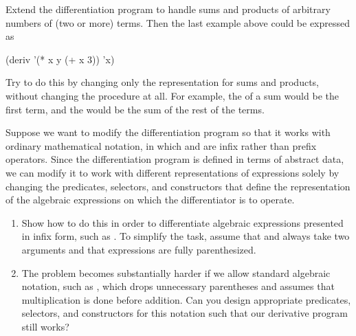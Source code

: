 \begin{exercise}
	\label{Exercise 2.57}
	Extend the differentiation program to handle sums and products of arbitrary numbers of (two or more) terms.
	Then the last example above could be expressed as
	\begin{scheme}
	  (deriv '(* x y (+ x 3)) 'x)
	\end{scheme}
	Try to do this by changing only the representation for sums and products, without changing the  procedure at all.
	For example, the  of a sum would be the first term, and the  would be the sum of the rest of the terms.
\end{exercise}



\begin{exercise}
	\label{Exercise 2.58}
	Suppose we want to modify the differentiation program so that it works with ordinary mathematical notation, in which \code{+} and \code{*} are infix rather than prefix operators.
	Since the differentiation program is defined in terms of abstract data, we can modify it to work with different representations of expressions solely by changing the predicates, selectors, and constructors that define the representation of the algebraic expressions on which the differentiator is to operate.
	\begin{enumerate}[label = \alph*., leftmargin = *]

		\item
			Show how to do this in order to differentiate algebraic expressions presented  in infix form, such as .
			To simplify the task, assume that \code{+} and \code{*} always take two arguments and that expressions are fully parenthesized.

		\item
			The problem becomes substantially harder if we allow standard algebraic notation, such as , which drops unnecessary parentheses and assumes that multiplication is done before addition.
			Can you design appropriate predicates, selectors, and constructors for this notation such that our derivative program still works?

	\end{enumerate}
\end{exercise}
